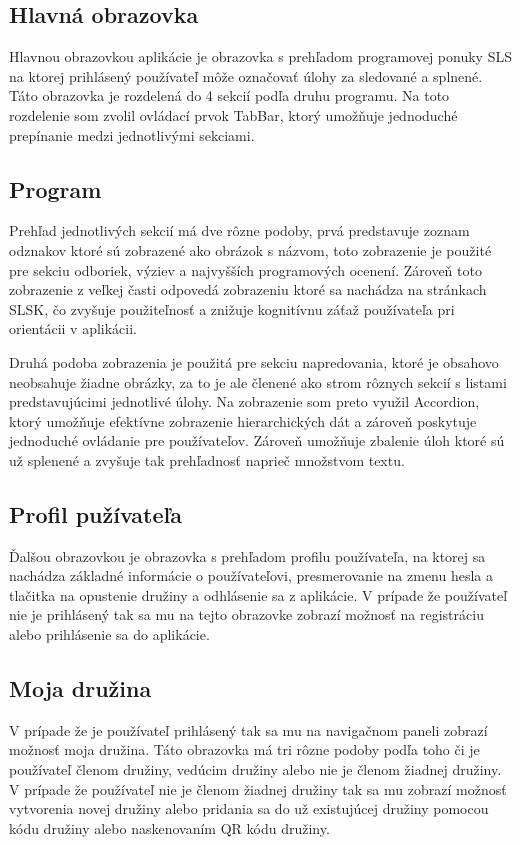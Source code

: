 \subsection{Hlavná obrazovka}
Hlavnou obrazovkou aplikácie je obrazovka s prehľadom programovej ponuky SLS na ktorej prihlásený používateľ môže označovať úlohy za sledované a splnené. Táto obrazovka je rozdelená do 4 sekcií podľa druhu programu. Na toto rozdelenie som zvolil ovládací prvok TabBar, ktorý umožňuje jednoduché prepínanie medzi jednotlivými sekciami.

\subsection{Program}
Prehľad jednotlivých sekcií má dve rôzne podoby, prvá predstavuje zoznam odznakov ktoré sú zobrazené ako obrázok s názvom, toto zobrazenie je použité pre sekciu odboriek, výziev a najvyšších programových ocenení. Zároveň toto zobrazenie z veľkej časti odpovedá zobrazeniu ktoré sa nachádza na stránkach SLSK, čo zvyšuje použiteľnosť a znižuje kognitívnu záťaž používateľa pri orientácii v aplikácii.

Druhá podoba zobrazenia je použitá pre sekciu napredovania, ktoré je obsahovo neobsahuje žiadne obrázky, za to je ale členené ako strom rôznych sekcií s listami predstavujúcimi jednotlivé úlohy. Na zobrazenie som preto využil Accordion, ktorý umožňuje efektívne zobrazenie hierarchických dát a zároveň poskytuje jednoduché ovládanie pre používateľov. Zároveň umožňuje zbalenie úloh ktoré sú už splenené a zvyšuje tak prehľadnosť naprieč množstvom textu.

\subsection{Profil pužívateľa}
Ďalšou obrazovkou je obrazovka s prehľadom profilu používateľa, na ktorej sa nachádza základné informácie o používateľovi, presmerovanie na zmenu hesla a tlačitka na opustenie družiny a odhlásenie sa z aplikácie. V prípade že používateľ nie je prihlásený tak sa mu na tejto obrazovke zobrazí možnosť na registráciu alebo prihlásenie sa do aplikácie.

\subsection{Moja družina}
V prípade že je používateľ prihlásený tak sa mu na navigačnom paneli zobrazí možnosť moja družina. Táto obrazovka má tri rôzne podoby podľa toho či je používateľ členom družiny, vedúcim družiny alebo nie je členom žiadnej družiny. V prípade že používateľ nie je členom žiadnej družiny tak sa mu zobrazí možnosť vytvorenia novej družiny alebo pridania sa do už existujúcej družiny pomocou kódu družiny alebo naskenovaním QR kódu družiny.

